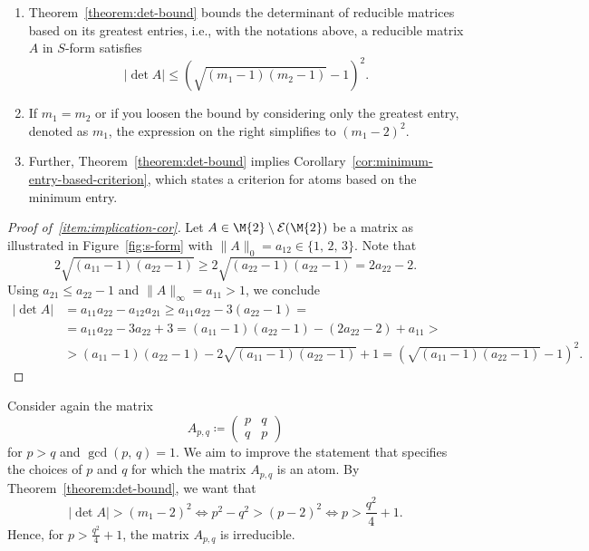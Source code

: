 \begin{remark*}
\mbox{}\vspace{-2\topskip}
\begin{enumerate}[label=(\alph*)]
\item Theorem~\ref{theorem:det-bound} bounds the determinant of reducible matrices based on its greatest entries, i.e., with the notations above, a reducible matrix $A$ in $S$-form satisfies 
\[  \left \lvert \det{A} \right \rvert \leq (\sqrt{(m_1-1)(m_2-1)}-1)^2 . \]
\item If $m_1 = m_2$ or if you loosen the bound by considering only the greatest entry, denoted as $m_1$, the expression on the right simplifies to $(m_1-2)^2$.
\item\label{item:implication-cor} Further, Theorem~\ref{theorem:det-bound} implies Corollary~\ref{cor:minimum-entry-based-criterion}, which states a criterion for atoms based on the minimum entry.
\end{enumerate}
\end{remark*}

\begin{proof}[Proof of~\ref{item:implication-cor}]
Let $A \in \M{2}\setminus\mathcal{E}(\M{2})$ be a matrix as illustrated in Figure~\ref{fig:s-form} with $\| A\|_0 = a_{12} \in \{ 1,\, 2,\, 3\}$. Note that 
\[ 2\sqrt{(a_{11}-1)(a_{22}-1)} \geq 2\sqrt{(a_{22}-1)(a_{22}-1)} = 2a_{22}-2. \]
Using $a_{21} \leq a_{22} - 1$ and $\| A \|_{\infty} = a_{11}>1$, we conclude
\begin{align*}
\left \lvert \det{A} \right \rvert &= a_{11}a_{22}-a_{12}a_{21} \geq a_{11}a_{22}-3(a_{22}-1) = \\
&=  a_{11}a_{22}-3a_{22} +3 = (a_{11}-1)(a_{22}-1) - (2a_{22} -2) + a_{11} > \\
&> (a_{11}-1)(a_{22}-1) - 2\sqrt{(a_{11}-1)(a_{22}-1)} + 1 = (\sqrt{(a_{11}-1)(a_{22}-1)}-1)^2.
\end{align*} 
\end{proof}

\begin{example}
Consider again the matrix 
\[ A_{p,q} \coloneqq \begin{pmatrix} p & q \\ q & p \end{pmatrix} \]
for $p >q$ and $\gcd(p,\,q) =1$. We aim to improve the statement that specifies the choices of $p$ and $q$ for which the matrix $A_{p,q}$ is an atom. By Theorem~\ref{theorem:det-bound}, we want that 
\[ \left \lvert \det{A} \right \rvert > (m_1-2)^2 \iff p^2-q^2 > (p-2)^2 \iff p > \frac{q^2}{4} +1. \]
Hence, for $p> \frac{q^2}{4} +1$, the matrix $A_{p,q}$ is irreducible.
\end{example}

